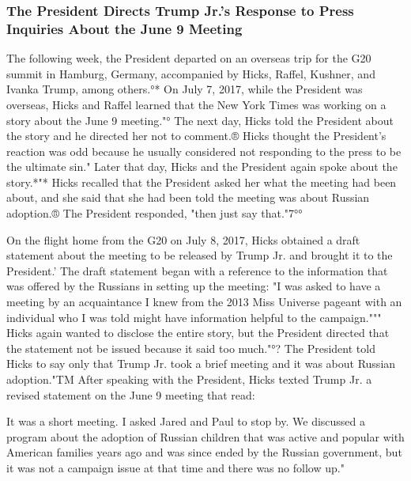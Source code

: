 \subsubsection{The President Directs Trump Jr.'s Response to Press Inquiries About the June 9 Meeting}

The following week, the President departed on an overseas trip for the G20 summit in Hamburg, Germany, accompanied by Hicks, Raffel, Kushner, and Ivanka Trump, among others.°*
On July 7, 2017, while the President was overseas, Hicks and Raffel learned that the New York Times was working on a story about the June 9 meeting."°
The next day, Hicks told the President about the story and he directed her not to comment.®
Hicks thought the President's reaction was odd because he usually considered not responding to the press to be the ultimate sin."
Later that day, Hicks and the President again spoke about the story.*"*
Hicks recalled that the President asked her what the meeting had been about, and she said that she had been told the meeting was about Russian adoption.® The President responded, "then just say that."7°°

On the flight home from the G20 on July 8, 2017, Hicks obtained a draft statement about the meeting to be released by Trump Jr. and brought it to the President.'
The draft statement began with a reference to the information that was offered by the Russians in setting up the meeting: "I was asked to have a meeting by an acquaintance I knew from the 2013 Miss Universe pageant with an individual who I was told might have information helpful to the campaign."""
Hicks again wanted to disclose the entire story, but the President directed that the statement not be
issued because it said too much."°? The President told Hicks to say only that Trump Jr. took a brief meeting and it was about Russian adoption."TM
After speaking with the President, Hicks texted Trump Jr. a revised statement on the June 9 meeting that read:

It was a short meeting.
I asked Jared and Paul to stop by.
We discussed a program about the adoption of Russian children that was active and popular with American families years ago and was since ended by the Russian government, but it was not a campaign issue at that time and there was no follow up."

